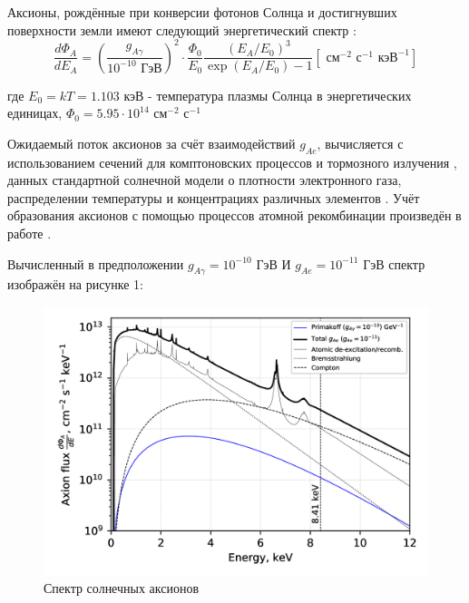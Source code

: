\documentclass[a4paper,article,14pt]{extarticle}
\begin{document}
Аксионы, рождённые при конверсии фотонов Солнца и достигнувших поверхности земли имеют следующий энергетический спектр \cite{solarflux1, solarflux2, solarflux3}:
\begin{equation}
\frac{{d{\Phi _A}}}{{d{E_A}}} = {\left( {\frac{{{g_{A\gamma }}}}{{{{{10}^{ - 10}}} \text{ ГэВ}}}} \right)^2} \cdot \frac{{{\Phi _0}}}{{{E_0}}}\frac{{{{\left( {{E_A}/{E_0}} \right)}^3}}}{{\exp \left( {{E_A}/{E_0}} \right) - 1}} \left[ \text{ см} ^{-2} \text{ с} ^{-1} \text{ кэВ} ^{-1} \right]
\end{equation}

где ${E_0} = kT = 1.103 \text{ кэВ}$ - температура плазмы Солнца в энергетических единицах, ${{\Phi _0}} = 5.95 \cdot 10^{14} \text{ см} ^{-2} \text{ с} ^{-1}$

Ожидаемый поток аксионов за счёт взаимодействий $g_{Ae}$, вычисляется с использованием сечений для комптоновских процессов \cite{pospelov2008bosonic,gondolo2009solar} и тормозного излучения \cite{brem}, данных стандартной солнечной модели о плотности электронного газа, распределении температуры и концентрациях различных элементов \cite{kekez2009search,derbin2011constraints}. Учёт образования аксионов с помощью процессов атомной рекомбинации произведён в работе \cite{redondo2013solar}.

\newpage
Вычисленный в предположении $g_{A\gamma } = {10}^{ - 10} \text{ ГэВ}$ И $g_{Ae } = {10}^{ - 11} \text{ ГэВ}$ спектр изображён на рисунке 1:

\begin{figure}[h]
    \centering
    \includegraphics[width = \textwidth]{images/flux_solar.png}
    \caption{Спектр солнечных аксионов}
    \label{flux}
\end{figure}
\end{document}
